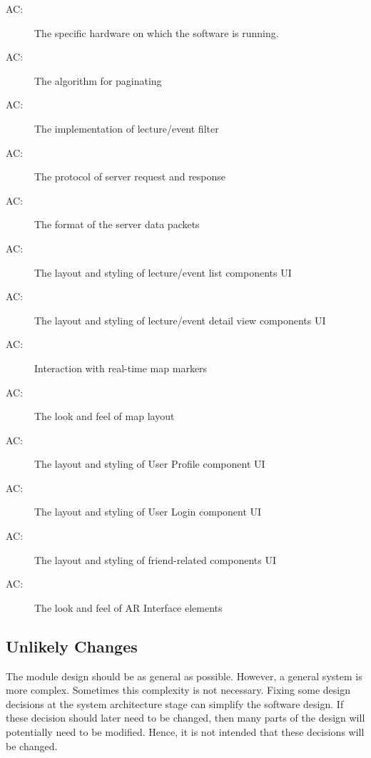\documentclass[12pt, titlepage]{article}
\newcounter{acnum}
\newcommand{\actheacnum}{AC\theacnum}
\begin{document}
\begin{description}
\item[ \actheacnum \label{acHardware}:] The specific
  hardware on which the software is running.
\item[ \actheacnum \label{acPaginate}:] The algorithm for paginating
\item[ \actheacnum \label{acFilter}:] The implementation of lecture/event filter
\item[ \actheacnum \label{acProtocol}:] The protocol of server request and response
\item[ \actheacnum \label{acServerData}:] The format of the server data packets
\item[ \actheacnum \label{acListUI}:] The layout and styling of lecture/event list components UI
\item[ \actheacnum \label{acDetailViewUI}:] The layout and styling of lecture/event detail view components UI
\item[ \actheacnum \label{acMapInteract}:] Interaction with real-time map markers
\item[ \actheacnum \label{acMapLayout}:] The look and feel of map layout
\item[ \actheacnum \label{acUserUI}:] The layout and styling of User Profile component UI
\item[ \actheacnum \label{acLoginUI}:] The layout and styling of User Login component UI
\item[ \actheacnum \label{acFriendUI}:] The layout and styling of friend-related components UI
\item[ \actheacnum \label{acARUI}:] The look and feel of AR Interface elements
\end{description}

\subsection{Unlikely Changes} \label{SecUchange}

The module design should be as general as possible. However, a general system is
more complex. Sometimes this complexity is not necessary. Fixing some design
decisions at the system architecture stage can simplify the software design. If
these decision should later need to be changed, then many parts of the design
will potentially need to be modified. Hence, it is not intended that these
decisions will be changed.
\end{document}
